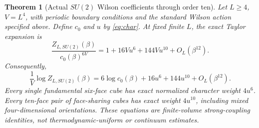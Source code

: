 \documentclass[11pt,a4paper]{article}
\newtheorem{theorem}{Theorem}
\begin{document}
\begin{theorem}[Actual $SU(2)$ Wilson coefficients through order ten]
\label{thm:su2}
Let $L\ge4$, $V=L^4$, with periodic boundary conditions and the
standard Wilson action specified above. Define $c_0$ and $u$ by
\eqref{eq:char}. At fixed finite $L$, the exact Taylor expansion is
\begin{equation}\label{eq:su2partition}
\boxed{\;
\frac{Z_{L,SU(2)}(\beta)}{c_0(\beta)^{6V}}
 =1+16Vu^6+144Vu^{10}+O_L(\beta^{12}).
\;}
\end{equation}
Consequently,
\begin{equation}\label{eq:su2pressure}
\frac1V\log Z_{L,SU(2)}(\beta)
=6\log c_0(\beta)+16u^6+144u^{10}
+O_L(\beta^{12}).
\end{equation}
Every single fundamental six-face cube has exact normalized character
weight $4u^6$. Every ten-face pair of face-sharing cubes has exact
weight $4u^{10}$, \emph{including mixed four-dimensional orientations}.
These equations are finite-volume strong-coupling identities, not
thermodynamic-uniform or continuum estimates.
\end{theorem}
\end{document}
